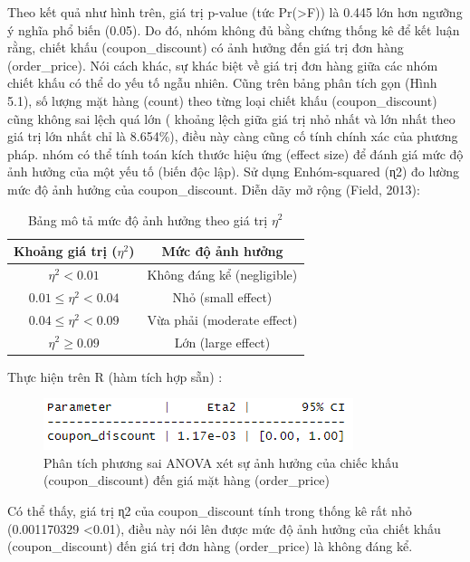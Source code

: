Theo kết quả như hình trên, giá trị p-value (tức Pr(>F)) là 0.445 lớn hơn ngưỡng ý nghĩa phổ biến (0.05). Do đó, nhóm không đủ bằng chứng thống kê để kết luận rằng, chiết khấu (coupon\_discount) có ảnh hưởng đến giá trị đơn hàng (order\_price). Nói cách khác, sự khác biệt về giá trị đơn hàng giữa các nhóm chiết khấu có thể do yếu tố ngẫu nhiên.
Cũng trên bảng phân tích gọn (Hình 5.1),  số lượng mặt hàng (count) theo từng loại chiết khấu (coupon\_discount) cũng  không sai lệch quá lớn ( khoảng lệch giữa giá trị nhỏ nhất và lớn nhất theo giá trị lớn nhất chỉ là 8.654\%), điều này càng cũng cố tính chính xác của phương pháp.
nhóm có thể tính toán kích thước hiệu ứng (effect size) để đánh giá mức độ ảnh hưởng của một yếu tố (biến độc lập). Sử dụng Enhóm-squared (ɳ2) đo lường mức độ ảnh hưởng của coupon\_discount. Diễn dãy mở rộng (Field, 2013):

\begin{table}[ht]
    \centering
    \begin{tabular}{|c|c|}
    \hline
    \textbf{Khoảng giá trị ($\eta^2$)} & \textbf{Mức độ ảnh hưởng} \\ 
    \hline
    $\eta^2 < 0.01$ & Không đáng kể (negligible) \\ 
    \hline
    $0.01 \leq \eta^2 < 0.04$ & Nhỏ (small effect) \\ 
    \hline
    $0.04 \leq \eta^2 < 0.09$ & Vừa phải (moderate effect) \\ 
    \hline
    $\eta^2 \geq 0.09$ & Lớn (large effect) \\ 
    \hline
    \end{tabular}
    \caption{Bảng mô tả mức độ ảnh hưởng theo giá trị $\eta^2$}
    \label{table:effect_size}
\end{table}

Thực hiện trên R (hàm tích hợp sẵn) :
\begin{figure}[!htbp]
    \centering
    \includegraphics[width=0.6\linewidth]{graphics/5.3.3.png}
    \caption{Phân tích phương sai ANOVA xét sự ảnh hưởng của chiếc khấu (coupon\_discount) đến giá mặt hàng (order\_price)}
\end{figure}

Có thể thấy, giá trị ɳ2  của  coupon\_discount  tính trong thống kê rất nhỏ (0.001170329 <0.01), điều này nói lên được mức độ ảnh hưởng của chiết khấu (coupon\_discount) đến giá trị đơn hàng (order\_price) là không đáng kể.